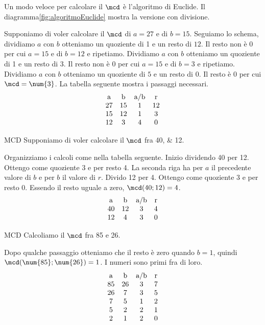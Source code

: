    Un modo veloce per calcolare il $\mcd$ è l'algoritmo di Euclide. Il diagramma\nobs\vref{fig:algoritmoEuclide} mostra la versione con divisione. 
   
   Supponiamo di voler calcolare il $\mcd$ di $a=\num{27}$ e di $b=\num{15}$. Seguiamo lo schema, dividiamo $a$ con $b$ otteniamo un quoziente di 1 e un resto di $12$. Il resto non è $0$ per cui $a=\num{15}$ e di $b=\num{12}$ e ripetiamo. Dividiamo $a$ con $b$ otteniamo un quoziente di 1 e un resto di $3$. Il resto non è $0$ per cui $a=\num{15}$ e di $b=\num{3}$ e ripetiamo.  Dividiamo $a$ con $b$ otteniamo un quoziente di $5$ e un resto di $0$. Il resto è $0$ per cui $\mcd=\num{3}$. La tabella seguente mostra i passaggi necessari.
 \[
\begin{array}{cccc}
$a$&$b$&$a/b$&$r$\\
	27&15&1&12\\
    15&12&1&3\\
    12&3&4&0
    \end{array} 
    \]
 \begin{esempiot}{MCD}{}
    Supponiamo di voler calcolare il $\mcd$ fra \numlist{40;12}. 
 \end{esempiot}   
    Organizziamo  i calcoli come nella tabella seguente. Inizio dividendo \num{40} per \num{12}. Ottengo come quoziente  \num{3} e per resto  \num{4}. La seconda riga ha per $a$ il precedente valore di $b$ e per $b$ il valore di $r$. Divido  \num{12} per \num{4}. Ottengo come quoziente  \num{3} e per resto  \num{0}. Essendo il resto uguale a zero, $\mcd(40;12)=4$.
       \[
      \begin{array}{cccc}
      $a$&$b$&$a/b$&$r$\\
      		40&12&3&4\\
      	   	12&4&3&0
          \end{array} 
          \]
       \begin{esempiot}{MCD}{}
    Calcoliamo il $\mcd$ fra \num{85} e \num{26}. 
       \end{esempiot}
    Dopo qualche passaggio otteniamo che il resto è zero quando $b=1$, quindi $\mcd(\num{85};\num{26})=1$. I numeri sono primi fra di loro. 
   	   \[
   	   \begin{array}{cccc}
   	   $a$&$b$&$a/b$&$r$\\
   	   	85&26&3&7\\
   	   	26&7&3&5\\
   	   	7&5&1&2\\
   	   	5&2&2&1\\
   	   	2&1&2&0
   	    \end{array} 
   	     \]
